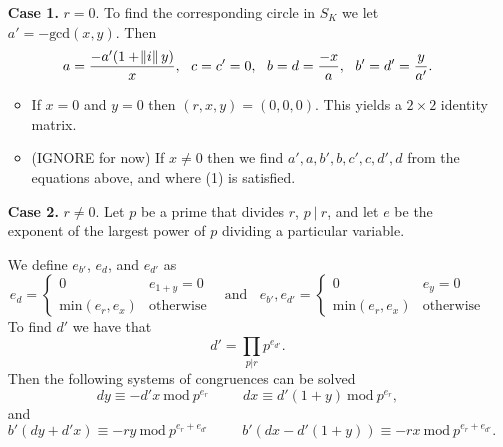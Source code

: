 \documentclass[9pt]{article}
\begin{document}
\begin{itemize}
	\item[\textbf{Case 1.}] $r = 0$. To find the corresponding circle in $S_K$ we let $a' = -\text{gcd}(x,y)$. Then
	\begin{equation*}
	a = \frac{-a'(1 + \norm{i}y)}{x}, ~~ c = c' = 0, ~~ b = d = \frac{-x}{a}, ~~ b' = d' = \frac{y}{a'}.
	\end{equation*}
	\begin{itemize}
		\item If $x=0$ and $y=0$ then $(r,x,y) = (0,0,0)$. This yields a $2 \times 2$ identity matrix.
		\item (IGNORE for now) If $x \neq 0$ then we find $a',a,b',b,c',c,d',d$ from the equations above, and where (1) is satisfied.
	\end{itemize}
	\item[\textbf{Case 2.}] $r \neq 0$. Let $p$ be a prime that divides $r$, $p~|~r$, and let $e$ be the exponent of the largest power of $p$ dividing a particular variable.
	
	We define $e_{b'}$, $e_d$, and $e_{d'}$ as 
	\begin{equation}
	e_d =
	\begin{cases}
	0 & e_{1+y} = 0 \\
	\text{min}(e_r, e_x) & \text{otherwise}
	\end{cases}
	~~~~\text{and}~~~~
	e_{b'}, e_{d'} = 
	\begin{cases}
	0 & e_y = 0 \\
	\text{min}(e_r, e_x) & \text{otherwise} 
	\end{cases}
	\end{equation}
	To find $d'$ we have that
	\begin{equation}
	d' = \prod_{p|r} p^{e_{d'}}.
	\end{equation}
	Then the following systems of congruences can be solved
	\begin{equation}
	dy \equiv -d'x~\text{mod}~p^{e_r}~~~~~~~~~~~dx \equiv d'(1 + y)~\text{mod}~p^{e_r},
	\end{equation}
	and
	\begin{equation}
	b'(dy + d'x) \equiv -ry~\text{mod}~p^{e_r + e_{d'}}~~~~~~~~~~~b'\left(dx - d'(1 + y)\right) \equiv -rx~\text{mod}~p^{e_r + e_{d'}}.
	\end{equation}
	

\end{itemize}
\end{document}

